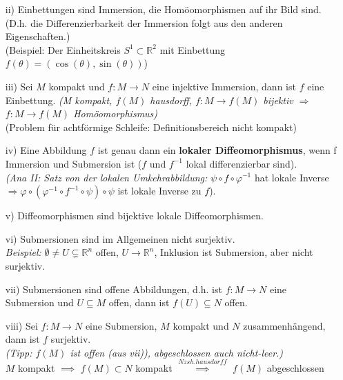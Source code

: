 \documentclass[fleqn, 12pt, letterpaper]{article}
\begin{document}
\begin{itemize}
\item[ii)] Einbettungen sind Immersion, die Homöomorphismen auf ihr Bild sind. (D.h. die Differenzierbarkeit der Immersion folgt aus den anderen Eigenschaften.)\\
(Beispiel: Der Einheitskreis $S^1\subset \mathbb{R}^2$ mit Einbettung $f(\theta)=(\cos(\theta), \sin(\theta))$)

\item[iii)] Sei \( M \) kompakt und \( f: M \to N \) eine injektive Immersion, dann ist \( f \) eine Einbettung. 
\textit{(M kompakt, \( f(M) \) hausdorff, \( f: M \to f(M) \) bijektiv \( \Rightarrow \) \( f: M \to f(M) \) Homöomorphismus)}\\
(Problem für achtförmige Schleife: Definitionsbereich nicht kompakt)

\item[iv)] Eine Abbildung \( f \) ist genau dann ein \textbf{lokaler Diffeomorphismus}, wenn f Immersion und Submersion ist (\( f \) und \( f^{-1} \) lokal differenzierbar sind).\\
\textit{(Ana II: Satz von der lokalen Umkehrabbildung:}  \( \psi \circ f \circ \varphi^{-1} \) hat lokale Inverse \( \Rightarrow \varphi\circ (\varphi^{-1} \circ f^{-1} \circ \psi)\circ \psi \) ist lokale Inverse zu \( f \)).

\item[v)] Diffeomorphismen sind bijektive lokale Diffeomorphismen.

\item[vi)] Submersionen sind im Allgemeinen nicht surjektiv.\\
\textit{Beispiel:} \( \emptyset \neq U \subsetneq \mathbb{R}^n \) offen, \( U \to \mathbb{R}^n \), Inklusion ist Submersion, aber nicht surjektiv.
\end{itemize}
\begin{itemize}
\item[vii)] Submersionen sind offene Abbildungen, d.h. ist \( f: M \to N \) eine Submersion und \( U \subseteq M \) offen, dann ist \( f(U)\subseteq N \) offen.

\item[viii)] Sei \( f: M \to N \) eine Submersion, \( M \) kompakt und \( N \) zusammenhängend,\\
\hspace*{1.5em} dann ist \( f \) surjektiv.\\
\textit{(Tipp: \( f(M) \) ist offen (aus vii)), abgeschlossen auch nicht-leer.)}\\
$M$ kompakt $\implies$ $f(M)\subset N$ kompakt $\overset{N zsh. hausdorff}{\implies}$ $f(M)$ abgeschlossen
\end{itemize}
\end{document}
